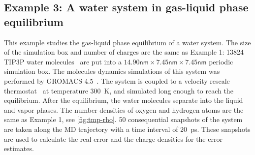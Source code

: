 \documentclass[journal=jacsat,manuscript=article]{achemso}
\begin{document}



\subsection{Example 3: A water system in gas-liquid phase equilibrium}
\label{sec:example3}

This example studies the gas-liquid phase equilibrium of a water
system. The size of the simulation box and number of charges are the
same as Example 1:
13824 TIP3P water
molecules~\cite{jorgensen1983comparison} are put into a
$14.90\textsf{nm}\times 7.45\textsf{nm}\times 7.45\textsf{nm}$
periodic simulation box.  The molecules dynamics simulations of this
system was performed by GROMACS 4.5~\cite{hess2008gromacs}.  The system
is coupled to a velocity rescale thermostat~\cite{bussi2007canonical}
at temperature 300~\textsf{K}, and simulated long enough to reach the
equilibrium. After the equilibrium,
the water molecules separate into the liquid and vapor phases.
The number densities of oxygen and hydrogen atoms
are the same as Example 1, see \ref{fig:tmp-rho}.
50 consequential snapshots of
the system are taken along the MD trajectory
with a time interval of 20~\textsf{ps}.  These
snapshots are used to calculate the real error and the charge densities
for the error estimates.
\end{document}

